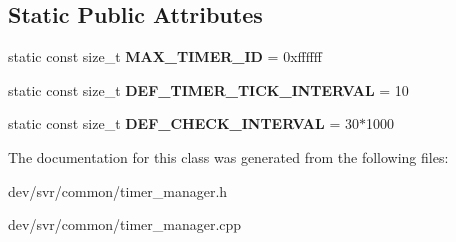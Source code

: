 \subsection*{Static Public Attributes}
\begin{DoxyCompactItemize}
\item 
\hypertarget{classTimerManager_ab8e26d413323cae3f6a9c6250d04cf7c}{
static const size\_\-t {\bfseries MAX\_\-TIMER\_\-ID} = 0xffffff}
\label{classTimerManager_ab8e26d413323cae3f6a9c6250d04cf7c}

\item 
\hypertarget{classTimerManager_a303db1cfb7662747065e655ef56a99d5}{
static const size\_\-t {\bfseries DEF\_\-TIMER\_\-TICK\_\-INTERVAL} = 10}
\label{classTimerManager_a303db1cfb7662747065e655ef56a99d5}

\item 
\hypertarget{classTimerManager_a7fa69d8915b8df557988d91cf3016c23}{
static const size\_\-t {\bfseries DEF\_\-CHECK\_\-INTERVAL} = 30$\ast$1000}
\label{classTimerManager_a7fa69d8915b8df557988d91cf3016c23}

\end{DoxyCompactItemize}


The documentation for this class was generated from the following files:\begin{DoxyCompactItemize}
\item 
dev/svr/common/timer\_\-manager.h\item 
dev/svr/common/timer\_\-manager.cpp\end{DoxyCompactItemize}

